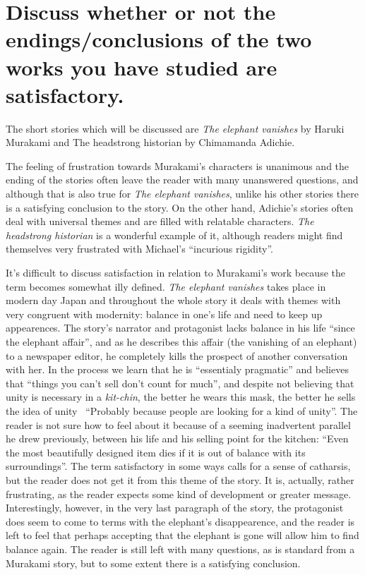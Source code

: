 \documentclass[12pt,a4paper]{article}
\begin{document}
\section{Discuss whether or not the endings/conclusions of the two works you have studied are  satisfactory.}

The short stories which will be discussed are \textit{The elephant vanishes} by Haruki Murakami and The headstrong historian by Chimamanda Adichie.

The feeling of frustration towards Murakami's characters is unanimous and the ending of the stories often leave the reader with many unanswered questions, and although that is also true for \textit{The elephant vanishes}, unlike his other stories there is a satisfying conclusion to the story. On the other hand, Adichie's stories often deal with universal themes and are filled with relatable characters. \textit{The headstrong historian} is a wonderful example of it, although readers might find themselves very frustrated with Michael's ``incurious rigidity''.

It's difficult to discuss satisfaction in relation to Murakami's work because the term becomes somewhat illy defined. \textit{The elephant vanishes} takes place in modern day Japan and throughout the whole story it deals with themes with very congruent with modernity: balance in one's life and need to keep up appearences. The story's narrator and protagonist lacks balance in his life ``since the elephant affair'', and as he describes this affair (the vanishing of an elephant) to a newspaper editor, he completely kills the prospect of another conversation with her. In the process we learn that he is ``essentialy pragmatic'' and believes that ``things you can't sell don't count for much'', and despite not believing that unity is necessary in a \textit{kit-chin}, the better he wears this mask, the better he sells the idea of unity \textendash\ ``Probably because people are looking for a kind of unity''. The reader is not sure how to feel about it because of a seeming inadvertent parallel he drew previously, between his life and his selling point for the kitchen: ``Even the most beautifully designed item dies if it is out of balance with its surroundings''. The term satisfactory in some ways calls for a sense of catharsis, but the reader does not get it from this theme of the story. It is, actually, rather frustrating, as the reader expects some kind of development or greater message. Interestingly, however, in the very last paragraph of the story, the protagonist does seem to come to terms with the elephant's disappearence, and the reader is left to feel that perhaps accepting that the elephant is gone will allow him to find balance again. The reader is still left with many questions, as is standard from a Murakami story, but to some extent there is a satisfying conclusion.
\end{document}
